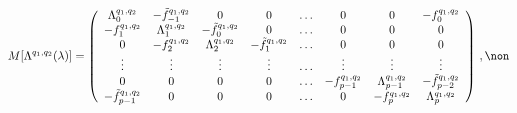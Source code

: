 \begin{equation}
M[\Lambda^{q_{1},q_{2}}(\lambda)]= \left(
        \begin{array}{cccccccc}
 \Lambda_{0}^{q_{1},q_{2}} &-\tilde f_{-1}^{q_{1},q_{2}} &0 &0 &\ldots &0 &0  &- f_{0}^{q_{1},q_{2}}    \\
 -f_{1}^{q_{1},q_{2}} &\Lambda_{1}^{q_{1},q_{2}} &-\tilde f_{0}^{q_{1},q_{2}} &0 &\ldots &0 &0 &0  \\
 0 &-f_{2}^{q_{1},q_{2}} &\Lambda_{2}^{q_{1},q_{2}} &-\tilde f_{1}^{q_{1},q_{2}} &\ldots &0 &0 &0  \\
 \vdots &\vdots   &\vdots   &\vdots    &\ldots  &\vdots   &\vdots   &\vdots  \\
 0 &0 &0 &0 &\ldots &-f_{p-1}^{q_{1},q_{2}} &\Lambda_{p-1}^{q_{1},q_{2}} &-\tilde f_{p-2}^{q_{1},q_{2}}  \\
-\tilde f_{p-1}^{q_{1},q_{2}} &0 &0 &0 &\ldots &0 &-f_{p}^{q_{1},q_{2}}&\Lambda_{p}^{q_{1},q_{2}} \\                       \end{array}\right)\,,\non\\
\label{matrix2}
\end{equation}

